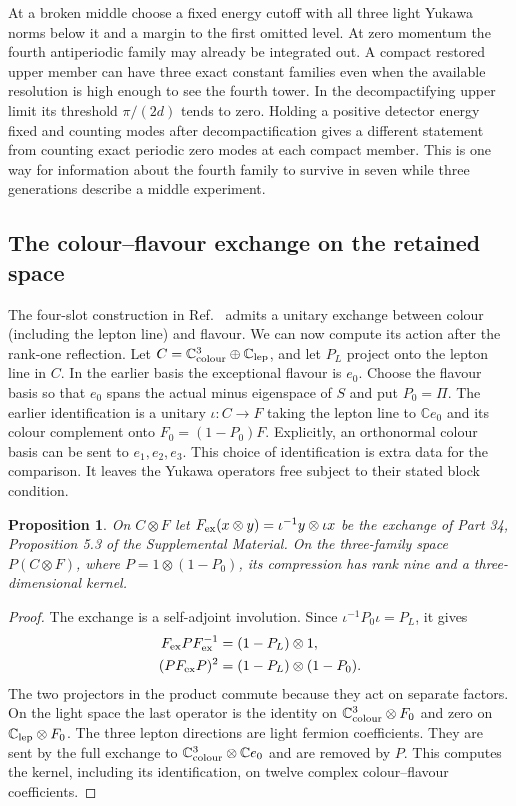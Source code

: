 \documentclass[aps,prd,reprint,onecolumn,nofootinbib,amsmath,amssymb]{revtex4-2}
\newtheorem{proposition}{Proposition}
\begin{document}
At a broken middle choose a fixed energy cutoff with all three light Yukawa norms below it and a margin to the first omitted level. At zero momentum the fourth antiperiodic family may already be integrated out. A compact restored upper member can have three exact constant families even when the available resolution is high enough to see the fourth tower. In the decompactifying upper limit its threshold $\pi/(2d)$ tends to zero. Holding a positive detector energy fixed and counting modes after decompactification gives a different statement from counting exact periodic zero modes at each compact member. This is one way for information about the fourth family to survive in seven while three generations describe a middle experiment.

\subsection{The colour--flavour exchange on the retained space}
The four-slot construction in Ref.~\cite{gennote} admits a unitary exchange between colour (including the lepton line) and flavour. We can now compute its action after the rank-one reflection. Let $C=\mathbb C^3_{\rm colour}\oplus\mathbb C_{\rm lep}$, and let $P_L$ project onto the lepton line in $C$. In the earlier basis the exceptional flavour is $e_0$. Choose the flavour basis so that $e_0$ spans the actual minus eigenspace of $S$ and put $P_0=\Pi$. The earlier identification is a unitary $\iota:C\to F$ taking the lepton line to $\mathbb C e_0$ and its colour complement onto $F_0=(1-P_0)F$. Explicitly, an orthonormal colour basis can be sent to $e_1,e_2,e_3$. This choice of identification is extra data for the comparison. It leaves the Yukawa operators free subject to their stated block condition.

\begin{proposition}\label{prop:compressedflip}
On $C\otimes F$ let $F_{\rm ex}(x\otimes y)=\iota^{-1}y\otimes\iota x$ be the exchange of Part 34, Proposition 5.3 of the Supplemental Material. On the three-family space $P(C\otimes F)$, where $P=1\otimes(1-P_0)$, its compression has rank nine and a three-dimensional kernel.
\end{proposition}
\begin{proof}
The exchange is a self-adjoint involution. Since $\iota^{-1}P_0\iota=P_L$, it gives
\begin{equation}
\begin{aligned}
 F_{\rm ex}P F_{\rm ex}^{-1}&=(1-P_L)\otimes1,\\
 (P F_{\rm ex}P)^2&=(1-P_L)\otimes(1-P_0).
\end{aligned}
\end{equation}
The two projectors in the product commute because they act on separate factors. On the light space the last operator is the identity on $\mathbb C^3_{\rm colour}\otimes F_0$ and zero on $\mathbb C_{\rm lep}\otimes F_0$. The three lepton directions are light fermion coefficients. They are sent by the full exchange to $\mathbb C^3_{\rm colour}\otimes\mathbb C e_0$ and are removed by $P$. This computes the kernel, including its identification, on twelve complex colour--flavour coefficients.
\end{proof}
\end{document}
